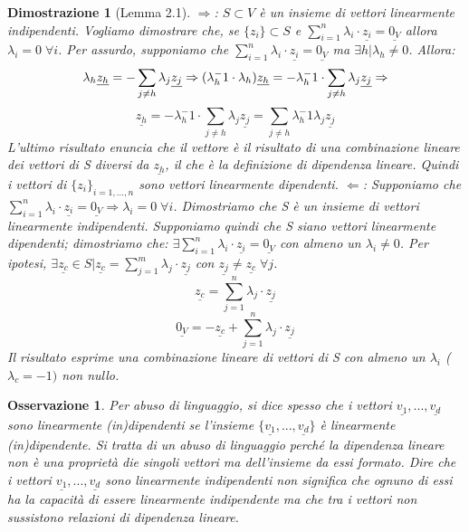 \documentclass[12pt]{article}
\newenvironment{para}{\begin{adjustwidth}{13mm}{}}{\end{adjustwidth}}
\newtheorem{Dimostrazione}{Dimostrazione}[subsection]
\newtheorem{Osservazione}{Osservazione}[subsection]
\begin{document}
\begin{para}
\begin{Dimostrazione}[Lemma 2.1]\; \newline
$\Rightarrow$: $S \subset V$ è un insieme di vettori linearmente indipendenti. Vogliamo dimostrare che, se $\{z_i\}\subset S$ e $\sum_{i=1}^n{\lambda_i \cdot \underline{z_i}}=\underline{0_V}$ allora $\lambda_i = 0 \; \forall i$. Per assurdo, supponiamo che $\sum_{i=1}^n{\lambda_i \cdot \underline{z_i}}=\underline{0_V}$ ma $\exists h| \lambda_h \neq 0$. Allora:
$$\lambda_h \underline{z_h} = -\sum_{j\neq h} {\lambda_j \underline{z_j}} \Rightarrow \newline
(\lambda_h ^-1 \cdot \lambda_h)\underline{z_h} = -\lambda_h^-1 \cdot \sum_{j\neq h} {\lambda_j \underline{z_j}} \Rightarrow$$
$$\underline{z_h} = -\lambda_h^-1 \cdot \sum_{j\neq h} {\lambda_j \underline{z_j}} = \sum_{j\neq h} {\lambda_h^-1\lambda_j \underline{z_j}}$$
L'ultimo risultato enuncia che il vettore è il risultato di una combinazione lineare dei vettori di S diversi da $\underline{z_h}$, il che è la definizione di dipendenza lineare. Quindi i vettori di $\{z_i\}_{i = 1,...,n}$ sono vettori linearmente dipendenti. \newline
$\Leftarrow$: Supponiamo che $\sum_{i=1}^n{\lambda_i \cdot \underline{z_i}}=\underline{0_V} \Rightarrow \lambda_i = 0 \; \forall i$. Dimostriamo che S è un insieme di vettori linearmente indipendenti. Supponiamo quindi che S siano vettori linearmente dipendenti; dimostriamo che:
$\exists \sum_{i=1}^n{\lambda_i \cdot \underline{z_i}}=\underline{0_V}$ con almeno un $\lambda_i \neq 0$. Per ipotesi, $\exists \underline{z_c} \in S | \underline{z_c} = \sum_{j=1}^m{\lambda_j \cdot \underline{z_j}}$ con $\underline{z_j} \neq \underline{z_c} \; \forall j$.
$$\underline{z_c} = \sum_{j=1}^n{\lambda_j \cdot \underline{z_j}}$$
$$\underline{0_V} = - \underline{z_c} + \sum_{j=1}^n{\lambda_j \cdot \underline{z_j}}$$
Il risultato esprime una combinazione lineare di vettori di S con almeno un $\lambda _i$ ($\lambda_c = -1)$
non nullo.
\end{Dimostrazione}
\begin{Osservazione}
Per abuso di linguaggio, si dice spesso che i vettori $\underline{v_1},...,\underline{v_d}$ sono linearmente (in)dipendenti se l'insieme $\{\underline{v_1},...,\underline{v_d}\}$ è linearmente (in)dipendente. Si tratta di un abuso di linguaggio perché la dipendenza lineare non è una proprietà die singoli vettori ma dell'insieme da essi formato. Dire che i vettori $\underline{v_1},...,\underline{v_d}$ sono linearmente indipendenti non significa che ognuno di essi ha la capacità di essere linearmente indipendente ma che tra i vettori non sussistono relazioni di dipendenza lineare.
\end{Osservazione}


\end{para}
\end{document}
